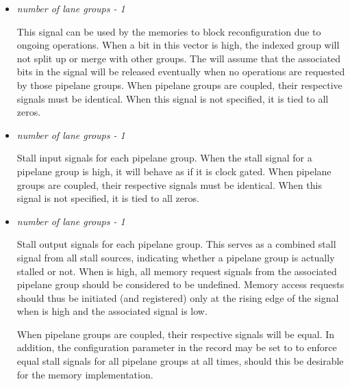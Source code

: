 \documentclass[main.tex]{subfiles}
\begin{document}
\begin{itemize}
  \vspace{1em}
  \item {}\textit{number of lane groups - 1}
  
  This signal can be used by the memories to block reconfiguration due to ongoing operations. When a bit in this vector is high, the indexed group will not split up or merge with other groups. The \rvex{} will assume that the associated bits in the  signal will be released eventually when no operations are requested by those pipelane groups. When pipelane groups are coupled, their respective  signals must be identical. When this signal is not specified, it is tied to all zeros.
  
  \vspace{1em}
  \item {}\textit{number of lane groups - 1}

  Stall input signals for each pipelane group. When the stall signal for a pipelane group is high, it will behave as if it is clock gated. When pipelane groups are coupled, their respective  signals must be identical. When this signal is not specified, it is tied to all zeros.
  
  \vspace{1em}
  \item {}\textit{number of lane groups - 1}
  
  Stall output signals for each pipelane group. This serves as a combined stall signal from all stall sources, indicating whether a pipelane group is actually stalled or not. When  is high, all memory request signals from the associated pipelane group should be considered to be undefined. Memory access requests should thus be initiated (and registered) only at the rising edge of the  signal when  is high and the associated  signal is low.
  
  When pipelane groups are coupled, their respective  signals will be equal. In addition, the  configuration parameter in the  record may be set to  to enforce equal stall signals for all pipelane groups at all times, should this be desirable for the memory implementation.

\end{itemize}
\end{document}
